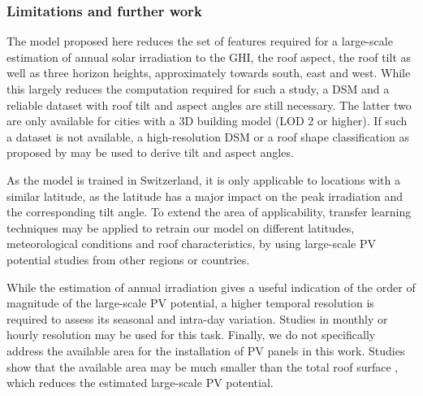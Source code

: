\subsubsection{Limitations and further work}
The model proposed here reduces the set of features required for a large-scale estimation of annual solar irradiation to the GHI, the roof aspect, the roof tilt as well as three horizon heights, approximately towards south, east and west. While this largely reduces the computation required for such a study, a DSM and a reliable dataset with roof tilt and aspect angles are still necessary. The latter two are only available for cities with a 3D building model (LOD 2 or higher). If such a dataset is not available, a high-resolution DSM or a roof shape classification as proposed by \cite{mohajeri_city-scale_2018} may be used to derive tilt and aspect angles. 

As the model is trained in Switzerland, it is only applicable to locations with a similar latitude, as the latitude has a major impact on the peak irradiation and the corresponding tilt angle. 
To extend the area of applicability, transfer learning techniques may be applied to retrain our model on different latitudes, meteorological conditions and roof characteristics, by using large-scale PV potential studies from other regions or countries.

While the estimation of annual irradiation gives a useful indication of the order of magnitude of the large-scale PV potential, a higher temporal resolution is required to assess its seasonal and intra-day variation. Studies in monthly \cite{assouline_large-scale_2018} or hourly \cite{buffat_scalable_2018} resolution may be used for this task. 
%
Finally, we do not specifically address the available area for the installation of PV panels in this work. Studies show that the available area may be much smaller than the total roof surface \cite{assouline_quantifying_2017}, which reduces the estimated large-scale PV potential.


